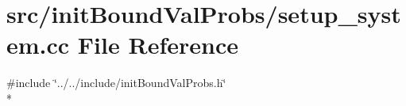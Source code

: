 \section{src/init\-Bound\-Val\-Probs/setup\-\_\-system.cc File Reference}
\label{setup__system_8cc}
{\ttfamily \#include \char`\"{}../../include/init\-Bound\-Val\-Probs.\-h\char`\"{}}\\*
